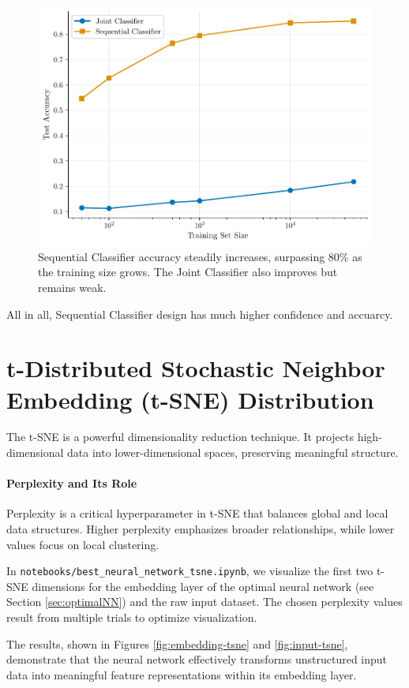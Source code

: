\documentclass{article}
\begin{document}
\begin{figure}[!htbp]
    \centering
    \includegraphics[width=0.8\linewidth]{./images/linear_classifier_comparison.pdf}
    \caption{Sequential Classifier accuracy steadily increases, surpassing 80\% as the training size grows. The Joint Classifier also improves but remains weak.}
\label{fig:linear}
\end{figure}

All in all, Sequential Classifier design has much higher confidence and accuarcy.

\section{t-Distributed Stochastic Neighbor Embedding (t-SNE) Distribution}

The t-SNE is a powerful dimensionality reduction technique. It projects high-dimensional data into lower-dimensional spaces, preserving meaningful structure.

\paragraph{Perplexity and Its Role}
Perplexity is a critical hyperparameter in t-SNE that balances global and local data structures. Higher perplexity emphasizes broader relationships, while lower values focus on local clustering.

In \texttt{notebooks/best\_neural\_network\_tsne.ipynb}, we visualize the first two t-SNE dimensions for the embedding layer of the optimal neural network (see Section \ref{sec:optimalNN}) and the raw input dataset. The chosen perplexity values result from multiple trials to optimize visualization.

The results, shown in Figures \ref{fig:embedding-tsne} and \ref{fig:input-tsne}, demonstrate that the neural network effectively transforms unstructured input data into meaningful feature representations within its embedding layer.
\end{document}
